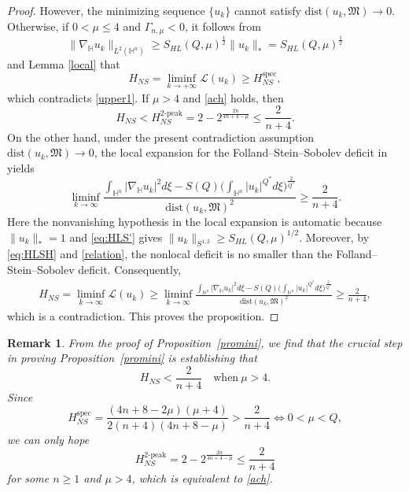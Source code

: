 \documentclass[11pt]{article}
\newtheorem{remark}{Remark}[section]
\begin{document}
\begin{proof}
However, the minimizing sequence $\{u_k\}$ cannot satisfy $\mathrm{dist}(u_k,\mathfrak{M})\rightarrow 0$. Otherwise, if $0<\mu\leq4$ and $\Gamma_{n,\mu}<0$, it follows from
\begin{equation*}
\|\nabla_\mathbb{H} u_k\|_{L^2(\mathbb{H}^n)}\geq S_{HL}(Q,\mu)^{\frac{1}{2}} \|u_k\|_*=S_{HL}(Q,\mu)^{\frac{1}{2}}
\end{equation*}
and Lemma \ref{local} that
\begin{equation*}
 H_{NS}= \liminf\limits_{k\rightarrow+\infty}\mathcal{L}(u_k){\geq}H_{NS}^{\mathrm{spec}},
\end{equation*}
which contradicts \eqref{upper1}. If $\mu>4$ and \eqref{ach} holds, then
\begin{equation*}
 H_{NS}<H_{NS}^{2\text{-peak}}= 2-2^{\frac{2n}{4n+4-\mu}} \leq\frac{2}{n+4}.
\end{equation*}
{On the other hand, under the present contradiction assumption $\mathrm{dist}(u_k,\mathfrak M)\to0$, the local expansion for the Folland--Stein--Sobolev deficit in \cite{LZ15} yields
\begin{equation*}
 \liminf_{k\to\infty}
 \frac{\int_{\mathbb{H}^{n}}|\nabla_{\mathbb{H}} u_k|^{2}{d}\xi-S(Q)\big(\int_{\mathbb{H}^{n}}|u_k|^{Q^{\ast}}d\xi\big)^{\frac{2}{Q^{\ast}}}}{\mathrm{dist}(u_k,\mathfrak{M})^2}\geq \frac{2}{n+4}.
\end{equation*}
Here the nonvanishing hypothesis in the local expansion is automatic because $\|u_k\|_*=1$ and \eqref{eq:HLS'} gives $\|u_k\|_{S^{1,2}}\ge S_{HL}(Q,\mu)^{1/2}$. Moreover, by \eqref{eq:HLSH} and \eqref{relation}, the nonlocal deficit is no smaller than the Folland--Stein--Sobolev deficit. Consequently,
\begin{align*}
 H_{NS}=\liminf_{k\to\infty}\mathcal{L}(u_k)
 \geq \liminf_{k\to\infty}
 \frac{\int_{\mathbb{H}^{n}}|\nabla_{\mathbb{H}} u_k|^{2}{d}\xi-S(Q)\big(\int_{\mathbb{H}^{n}}|u_k|^{Q^{\ast}}d\xi\big)^{\frac{2}{Q^{\ast}}}}{\mathrm{dist}(u_k,\mathfrak{M})^2}
 \geq\frac{2}{n+4},
\end{align*}
which is a contradiction.} This proves the proposition.
\end{proof}

\begin{remark}
{\rm From the proof of Proposition~\ref{promini}, we find that the crucial step in proving Proposition~\ref{promini} is establishing that
\begin{equation*}
 H_{NS}<\frac{2}{n+4}\quad \mathrm{when}~\mu>4.
\end{equation*}
Since
\begin{equation*}
 H_{NS}^{\mathrm{spec}}=\frac{(4n+8-2\mu)(\mu+4)}{2(n+4)(4n+8-\mu)}>\frac{2}{n+4} \Longleftrightarrow 0<\mu<Q,
\end{equation*}
we can only hope
\begin{equation*}
 H_{NS}^{2\text{-peak}}=2-2^{\frac{2n}{4n+4-\mu}} \leq\frac{2}{n+4}
\end{equation*}
for some $n\geq1$ and $\mu>4$,
which is equivalent to \eqref{ach}.
}
\end{remark}
\end{document}
